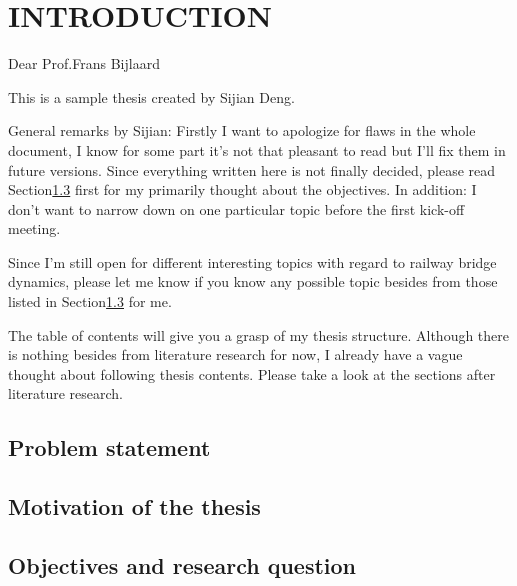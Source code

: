 
\chapter{INTRODUCTION}
Dear Prof.Frans Bijlaard

This is a sample thesis created by Sijian Deng.

General remarks by Sijian: Firstly I want to apologize for flaws in the whole document, I know for some part it's not that pleasant to read but I'll fix them in future versions. Since everything written here is not finally decided, please read Section\ref{sec:introduction} first for my primarily thought about the objectives. In addition: I don't want to narrow down on one particular topic before the first kick-off meeting. 

Since I'm still open for different interesting topics with regard to railway bridge dynamics, please let me know if you know any possible topic besides from those listed in Section\ref{sec:introduction} for me. 

The table of contents will give you a grasp of my thesis structure. Although there is nothing besides from literature research for now, I already have a vague thought about following thesis contents. Please take a look at the sections after literature research. 

\section{Problem statement}
\section{Motivation of the thesis}
\section{Objectives and research question}\label{sec:introduction}


